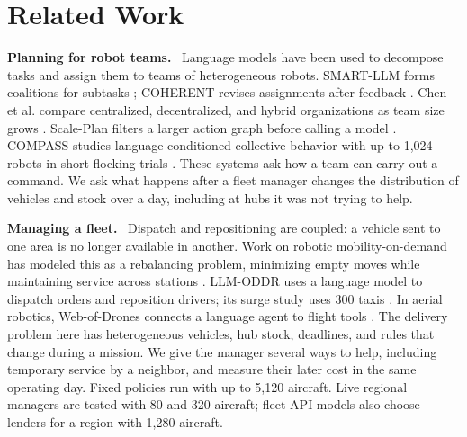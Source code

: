 \documentclass[letterpaper,10pt,conference]{ieeeconf}
\renewcommand{\paragraph}[1]{\par\textbf{#1.}\ }
\begin{document}
\section{Related Work}
\label{sec:related}

\paragraph{Planning for robot teams}
Language models have been used to decompose tasks and assign them to teams
of heterogeneous robots. SMART-LLM forms coalitions for subtasks
\cite{kannan2024smartllm}; COHERENT revises assignments after feedback
\cite{liu2025coherent}. Chen et al. compare centralized, decentralized,
and hybrid organizations as team size grows \cite{chen2024scalable}.
Scale-Plan filters a larger action graph before calling a model
\cite{gupta2026scaleplan}. COMPASS studies language-conditioned collective
behavior with up to 1,024 robots in short flocking trials
\cite{vatnsdal2026compass}. These systems ask how a team can carry out a
command. We ask what happens after a fleet manager changes the distribution
of vehicles and stock over a day, including at hubs it was not trying to
help.

\paragraph{Managing a fleet}
Dispatch and repositioning are coupled: a vehicle sent to one area is no
longer available in another. Work on robotic mobility-on-demand has
modeled this as a rebalancing problem, minimizing empty moves while
maintaining service across stations \cite{pavone2012load}. LLM-ODDR uses
a language model to dispatch
orders and reposition drivers; its surge study uses 300 taxis
\cite{lyu2025llmoddr}. In aerial robotics, Web-of-Drones connects a
language agent to flight tools
\cite{iannoli2026webofdrones}. The delivery problem here has heterogeneous
vehicles, hub stock, deadlines, and rules that change during a mission.
We give the manager several ways to help, including temporary service by a
neighbor, and measure their later cost in the same operating day. Fixed
policies run with up to 5,120 aircraft. Live regional managers are tested
with 80 and 320 aircraft; fleet API models also choose lenders for a
region with 1,280 aircraft.
\end{document}
